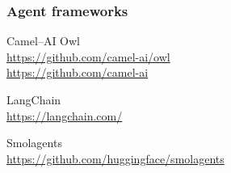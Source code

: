 \documentclass[17pt,aspectratio=169,hyperref={pdfusetitle,colorlinks,allcolors=olive}]{beamer}
\begin{document}
\begin{frame}[fragile]
  \frametitle{Agent frameworks}

  Camel--AI Owl \\
  {\small \url{https://github.com/camel-ai/owl} \\
  \url{https://github.com/camel-ai}}

  LangChain \\
  {\small \url{https://langchain.com/}}

  Smolagents \\
  {\small \url{https://github.com/huggingface/smolagents}}
\end{frame}





  



  
\end{document}
